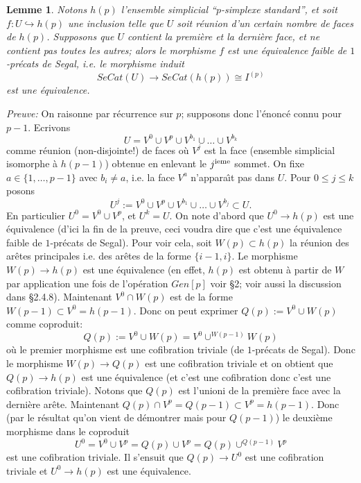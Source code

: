 \documentclass[12pt]{article}
\newtheorem{lemme}[lemma]{Lemme}
\begin{document}
\begin{lemme}
\label{faces}
Notons $h(p)$ l'ensemble simplicial ``$p$-simplexe standard'', et soit
$f:U\hookrightarrow h(p)$ une inclusion telle que $U$ soit r\'eunion d'un
certain
nombre de faces de $h(p)$. Supposons que $U$ contient la premi\`ere et la
derni\`ere face, et ne contient pas toutes les autres; alors le morphisme
$f$ est une \'equivalence faible de $1$-pr\'ecats de Segal, i.e. le
morphisme induit
$$
SeCat(U)\rightarrow SeCat(h(p))\cong I^{(p)}
$$
est une \'equivalence.
\end{lemme}
{\em Preuve:}
On raisonne par r\'ecurrence sur $p$; supposons donc
l'\'enonc\'e connu pour $p-1$.
Ecrivons
$$
U= V^0\cup V^p \cup V^{b_1}\cup \ldots \cup V^{b_k}
$$
comme r\'eunion (non-disjointe!) de faces o\`u $V^j$ est la face (ensemble
simplicial isomorphe \`a $h(p-1)$) obtenue en enlevant le $j^{\rm ieme}$
sommet. On fixe
$a\in \{ 1,\ldots , p-1\}$ avec $b_i\neq a$, i.e. la face $V^a$
n'appara\^{\i}t pas
dans $U$. Pour $0\leq j\leq k$ posons
$$
U^j:= V^0\cup V^p \cup V^{b_1}\cup \ldots \cup V^{b_j}\subset U.
$$
En particulier $U^0= V^0\cup V^p$, et $U^k=U$. On note d'abord que
$U^0\rightarrow h(p)$ est une \'equivalence (d'ici la fin de la preuve, ceci
voudra dire que c'est une \'equivalence faible de $1$-pr\'ecats de Segal).
Pour voir cela, soit $W(p)\subset h(p)$ la r\'eunion des ar\^etes principales
i.e. des ar\^etes de la forme $\{ i-1, i\}$. Le morphisme
$W(p)\rightarrow h(p)$ est une \'equivalence (en effet, $h(p)$ est obtenu \`a
partir de $W$ par application une fois de l'op\'eration $Gen[p]$ voir \S 2;
voir aussi la discussion dans \cite{limits} \S 2.4.8).
Maintenant $V^0\cap W(p)$ est de la forme $W(p-1)\subset V^0=h(p-1)$.
Donc on peut exprimer $Q(p):=V^0\cup W(p)$ comme coproduit:
$$
Q(p):=V^0\cup W(p) = V^0 \cup ^{W(p-1)}W(p)
$$
o\`u le premier morphisme est une cofibration triviale (de $1$-pr\'ecats de
Segal). Donc le morphisme $W(p)\rightarrow Q(p)$ est une cofibration
triviale et on obtient que $Q(p)\rightarrow h(p)$ est une
\'equivalence (et c'est une cofibration donc c'est une cofibration triviale).
Notons que $Q(p)$ est l'unioni de la premi\`ere face avec la derni\`ere ar\^ete.
Maintenant $Q(p) \cap V^p = Q(p-1)\subset V^p=h(p-1)$. Donc (par le r\'esultat
qu'on vient de d\'emontrer mais pour $Q(p-1)$) le deuxi\`eme  morphisme dans le
coproduit
$$
U^0= V^0\cup V^p = Q(p)\cup V^p = Q(p) \cup ^{Q(p-1)}V^p
$$
est une cofibration triviale. Il s'ensuit que $Q(p)\rightarrow U^0$ est une
cofibration triviale et $U^0\rightarrow h(p)$ est une \'equivalence.
\end{document}
